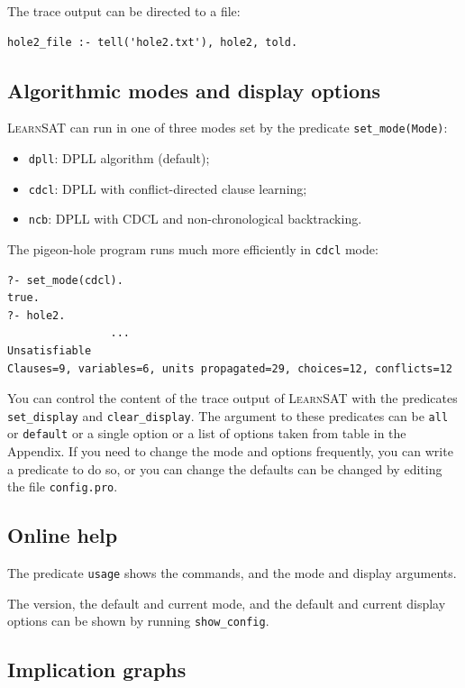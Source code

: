 \documentclass[11pt]{article}
\newcommand*{\p}[1]{\textup{\texttt{#1}}}
\newcommand*{\ls}{\textsc{LearnSAT}}
\begin{document}
The trace output can be directed to a file:

\begin{verbatim}
hole2_file :- tell('hole2.txt'), hole2, told.
\end{verbatim}

\subsection{Algorithmic modes and display options}

\ls{} can run in one of three modes set by the predicate \p{set\_mode(Mode)}:
\begin{itemize}
\item \p{dpll}: DPLL algorithm (default);
\item \p{cdcl}: DPLL with conflict-directed clause learning;
\item \p{ncb}:  DPLL with CDCL and non-chronological backtracking.
\end{itemize}

The pigeon-hole program runs much more efficiently in \p{cdcl} mode:
\begin{verbatim}
?- set_mode(cdcl).
true.
?- hole2.
                ...
Unsatisfiable
Clauses=9, variables=6, units propagated=29, choices=12, conflicts=12
\end{verbatim}

You can control the content of the trace output of \ls{} with the
predicates \p{set\_display} and \p{clear\_display}. The argument to
these predicates can be \p{all} or \p{default} or a single option or a
list of options taken from table in the Appendix. If you need to change
the mode and options frequently, you can write a predicate to do so, or
you can change the defaults can be changed by editing the file
\p{config.pro}.

\subsection{Online help}

The predicate \p{usage} shows the commands, and the mode and display
arguments.

The version, the default and current mode, and the default and current
display options can be shown by running \p{show\_config}.

\subsection{Implication graphs}\label{s.impl}
\end{document}
